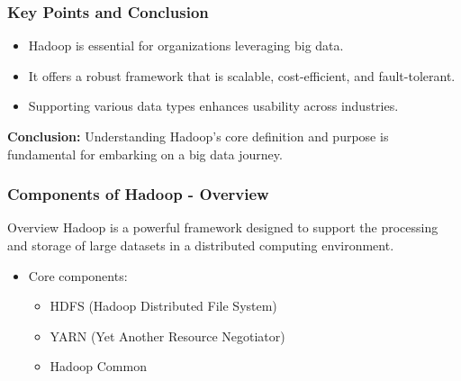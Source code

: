 \documentclass[aspectratio=169]{beamer}
\begin{document}
\begin{frame}[fragile]
    \frametitle{Key Points and Conclusion}
    \begin{itemize}
        \item Hadoop is essential for organizations leveraging big data.
        \item It offers a robust framework that is scalable, cost-efficient, and fault-tolerant.
        \item Supporting various data types enhances usability across industries.
    \end{itemize}
    \textbf{Conclusion:} Understanding Hadoop's core definition and purpose is fundamental for embarking on a big data journey.
\end{frame}

\begin{frame}[fragile]
    \frametitle{Components of Hadoop - Overview}
    \begin{block}{Overview}
        Hadoop is a powerful framework designed to support the processing and storage of large datasets in a distributed computing environment.
    \end{block}
    \begin{itemize}
        \item Core components:
        \begin{itemize}
            \item HDFS (Hadoop Distributed File System)
            \item YARN (Yet Another Resource Negotiator)
            \item Hadoop Common
        \end{itemize}
    \end{itemize}
\end{frame}
\end{document}

